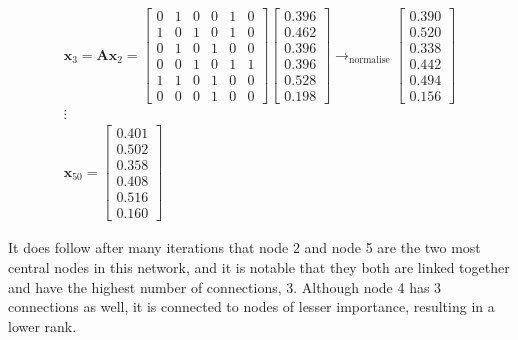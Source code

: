 \begin{align*}
\textbf{x}_3=\textbf{Ax}_2 = \begin{bmatrix}
0 & 1 & 0 & 0 & 1 & 0 \\
1 & 0 & 1 & 0 & 1 & 0 \\
0 & 1 & 0 & 1 & 0 & 0 \\
0 & 0 & 1 & 0 & 1 & 1 \\
1 & 1 & 0 & 1 & 0 & 0 \\
0 & 0 & 0 & 1 & 0 & 0
\end{bmatrix}\begin{bmatrix}
0.396 \\ 0.462 \\ 0.396 \\ 0.396 \\ 0.528 \\ 0.198
\end{bmatrix} \rightarrow_{\text{normalise}}
\begin{bmatrix}
0.390 \\ 0.520 \\ 0.338 \\ 0.442 \\ 0.494 \\ 0.156
\end{bmatrix}\\
\vdots \quad \quad \\
\textbf{x}_{50} = \begin{bmatrix}0.401\\0.502\\0.358\\0.408\\0.516\\0.160\end{bmatrix}
\end{align*}

It does follow after many iterations that node 2 and node 5 are the two most central nodes in this network, and it is notable that they both are linked together and have the highest number of connections, 3. Although node 4 has 3 connections as well, it is connected to nodes of lesser importance, resulting in a lower rank.










